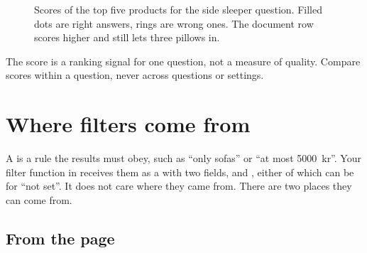 \documentclass[11pt]{article}
\begin{document}
\begin{figure}[H]
\centering
{}
\caption{Scores of the top five products for the side sleeper
question. Filled dots are right answers, rings are wrong ones. The
document row scores higher and still lets three pillows in.}
\label{fig:line}
\end{figure}

\begin{keypoint}
The score is a ranking signal for one question, not a measure of
quality. Compare scores within a question, never across questions or
settings.
\end{keypoint}

\section{Where filters come from}
\label{sec:filters}

A  is a rule the results must obey,
such as ``only sofas'' or ``at most 5000~kr''. Your filter function in
 receives them as a  with two
fields,  and , either of which can be
 for ``not set''. It does not care where they came from.
There are two places they can come from.

\subsection{From the page}
\end{document}
